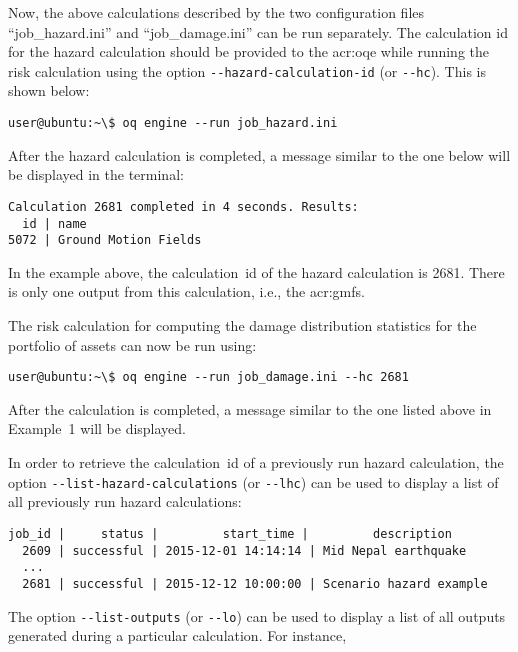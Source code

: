 Now, the above calculations described by the two configuration files
``job\_hazard.ini'' and ``job\_damage.ini'' can be run separately. The
calculation id for the hazard calculation should be
provided to the \glsdesc{acr:oqe} while running the risk calculation using the
option \Verb+--hazard-calculation-id+ (or \Verb+--hc+). This is shown below:

\begin{verbatim}
user@ubuntu:~\$ oq engine --run job_hazard.ini
\end{verbatim}

After the hazard calculation is completed, a message similar to the one below
will be displayed in the terminal:

\begin{verbatim}
Calculation 2681 completed in 4 seconds. Results:
  id | name
5072 | Ground Motion Fields
\end{verbatim}

In the example above, the calculation~id of the hazard calculation is 2681.
There is only one output from this calculation, i.e., the \glspl{acr:gmf}.

The risk calculation for computing the damage distribution statistics for the
portfolio of \glspl{asset} can now be run using:

\begin{verbatim}
user@ubuntu:~\$ oq engine --run job_damage.ini --hc 2681
\end{verbatim}

After the calculation is completed, a message similar to the one listed above
in Example~1 will be displayed.

In order to retrieve the calculation~id of a previously run hazard calculation,
the option \Verb+--list-hazard-calculations+ (or \Verb+--lhc+) can be used to
display a list of all previously run hazard calculations:

\begin{verbatim}
job_id |     status |         start_time |         description
  2609 | successful | 2015-12-01 14:14:14 | Mid Nepal earthquake
  ...
  2681 | successful | 2015-12-12 10:00:00 | Scenario hazard example
\end{verbatim}

The option \Verb+--list-outputs+ (or \Verb+--lo+) can be used to display a
list of all outputs generated during a particular calculation. For instance,

